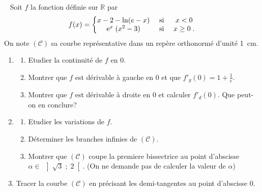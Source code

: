 \begin{exo} ~ \newline
Soit $f$ la fonction d\'efinie sur $\mathbb{R}$ par 
\begin{displaymath}
f(x) = 
\left\lbrace
\begin{matrix}
x - 2 - \ln ( e - x) & \text{ si } & x < 0     \\
\mathrm{e}^{x} \; (x^2 - 3)   & \text{ si } & x \geq 0  \; .
\end{matrix}
\right.
\end{displaymath}
On note $(\mathscr{C})$ sa courbe repr\'esentative dans un rep\`ere orthonorm\'e \Oij d'unit\'e 1~cm.
\begin{enumerate}
\item \begin{enumerate}
      \item Etudier la continuit\'e de $f$ en $0$.
      \item Montrer que $f$ est d\'erivable \`a gauche en $0$ et que $f'_g (0) = 1 + \frac{1}{e}$.
      \item Montrer que $f$ est d\'erivable \`a droite en $0$ et calculer $f'_d (0)$. Que peut-on en conclure?
      \end{enumerate}
\item \begin{enumerate}
      \item Etudier les variations de $f$.
      \item D\'eterminer les branches infinies de $(\mathscr{C})$.
      \item Montrer que $(\mathscr{C})$ coupe la premiere bissectrice au point d'abscisse $\alpha \in \; \left] \sqrt{3} \; ; \; 2 \right[$. 
            (On ne demande pas de calculer la valeur de $\alpha$)
      \end{enumerate}
\item Tracer la courbe $(\mathscr{C})$ en pr\'ecisant les demi-tangentes au point d'abscisse $0$.
\end{enumerate}
\end{exo}
